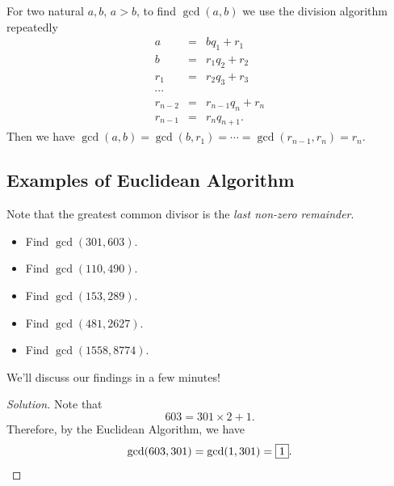 \clearpage

\begin{theorem}  For two natural $a,b$, $a>b$, to find $\gcd(a,b)$ we use the division algorithm repeatedly  \begin{eqnarray*}  a&=&bq_1+r_1 \\ b&=&r_1q_2+r_2 \\ r_1&=&r_2q_3+r_3 \\ \cdots \\ r_{n-2}&=&r_{n-1}q_n+r_n \\ r_{n-1}&=&r_nq_{n+1}. \end{eqnarray*}  
	Then we have $\gcd(a, b)=\gcd(b, r_1)=\cdots=\gcd(r_{n-1}, r_n)=r_n.$  \end{theorem}
\clearpage

\subsection*{Examples of Euclidean Algorithm}

Note that the greatest common divisor is the \textit{last non-zero remainder}. 
\begin{itemize}
		\item Find $\gcd(301, 603)$.  
		\item  Find $\gcd(110, 490)$.
		\item  Find $\gcd(153, 289)$.
		\item  Find $\gcd(481, 2627)$. 
\end{itemize}
\begin{itemize}[label=$\star$]
		\item Find $\gcd(1558, 8774)$. 
\end{itemize} 

We'll discuss our findings in a few minutes!

\clearpage


\begin{proof}[Solution]  
Note that $$603=301\times 2+1.$$  Therefore, by the Euclidean Algorithm, we have $$\gcd(603, 301)=\gcd(1, 301)=\framebox{1}.$$ 

\end{proof}

\clearpage


